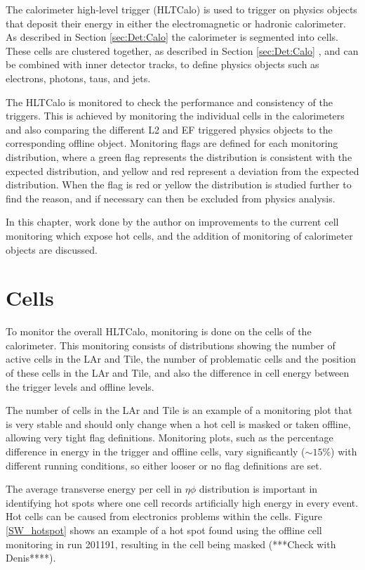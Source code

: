 The calorimeter high-level trigger (HLTCalo) is used to trigger on physics objects that deposit their energy in either the electromagnetic or hadronic calorimeter.
As described in Section \ref{sec:Det:Calo} the calorimeter is segmented into cells.
These cells are clustered together, as described in Section \ref{sec:Det:Calo} , and can be combined with inner detector tracks, to define physics objects such as electrons, photons, taus, and jets. 

The HLTCalo is monitored to check the performance and consistency of the triggers. 
This is achieved by monitoring the individual cells in the calorimeters and also comparing the different L2 and EF triggered physics objects to the corresponding offline object.
Monitoring flags are defined for each monitoring distribution, where a green flag represents the distribution is consistent with the expected distribution, and yellow and red represent a deviation from the expected distribution. 
When the flag is red or yellow the distribution is studied further to find the reason, and if necessary can then be excluded from physics analysis.


In this chapter, work done by the author on improvements to the current cell monitoring which expose hot cells, and the addition of monitoring of calorimeter objects are discussed. 

\section{Cells}

To monitor the overall HLTCalo, monitoring is done on the cells of the calorimeter.
This monitoring consists of distributions showing the number of active cells in the LAr and Tile, the number of problematic cells and the position of these cells in the LAr and Tile, and also the difference in cell energy between the trigger levels and offline levels.

The number of cells in the LAr and Tile is an example of a monitoring plot that is very stable and  should only change when a hot cell is masked or taken offline, allowing very tight flag definitions.
Monitoring plots, such as the percentage difference in energy in the trigger and offline cells, vary significantly ($\sim15\%$) with different running conditions, so either looser or no flag definitions are set.

The average transverse energy per cell in $\eta  \phi$ distribution is important in identifying hot spots where one cell records artificially high energy in every event.
Hot cells can be caused from electronics problems within the cells. 
Figure \ref{SW_hotspot} shows an example of a hot spot found using the offline cell monitoring in run 201191, resulting in the cell being masked (***Check with Denis****).

